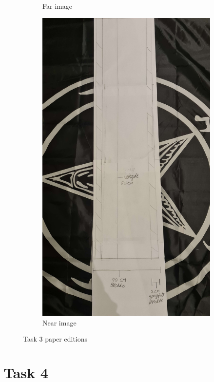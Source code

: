 \documentclass{report}
\newcommand{\subimgw}{.7\linewidth}
\begin{document}
\begin{figure}[H]
\begin{subfigure}{.5\textwidth}
		\caption{Far image}
	\end{subfigure}%
	\begin{subfigure}{.5\textwidth}
		\centering
		\includegraphics [width=\subimgw]{task-3-near}

		\caption{Near image}
	\end{subfigure}
	\caption{Task 3 paper editions}
	\label{fig:paper}
\end{figure}

\section{Task 4}
\end{document}
